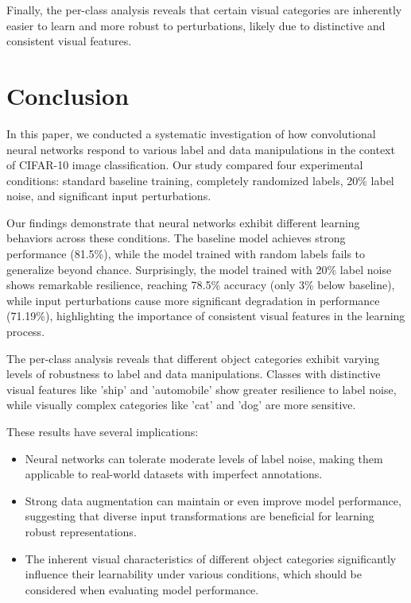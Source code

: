 \documentclass[10pt,twocolumn,letterpaper]{article}
\begin{document}
Finally, the per-class analysis reveals that certain visual categories are inherently easier to learn and more robust to perturbations, likely due to distinctive and consistent visual features.

\section{Conclusion}
\label{sec:conclusion}

In this paper, we conducted a systematic investigation of how convolutional neural networks respond to various label and data manipulations in the context of CIFAR-10 image classification.
Our study compared four experimental conditions: standard baseline training, completely randomized labels, 20\% label noise, and significant input perturbations.

Our findings demonstrate that neural networks exhibit different learning behaviors across these conditions.
The baseline model achieves strong performance (81.5\%), while the model trained with random labels fails to generalize beyond chance.
Surprisingly, the model trained with 20\% label noise shows remarkable resilience, reaching 78.5\% accuracy (only 3\% below baseline), while input perturbations cause more significant degradation in performance (71.19\%), highlighting the importance of consistent visual features in the learning process.

The per-class analysis reveals that different object categories exhibit varying levels of robustness to label and data manipulations.
Classes with distinctive visual features like 'ship' and 'automobile' show greater resilience to label noise, while visually complex categories like 'cat' and 'dog' are more sensitive.

These results have several implications:

\begin{itemize}
    \item Neural networks can tolerate moderate levels of label noise, making them applicable to real-world datasets with imperfect annotations.
    \item Strong data augmentation can maintain or even improve model performance, suggesting that diverse input transformations are beneficial for learning robust representations.
    \item The inherent visual characteristics of different object categories significantly influence their learnability under various conditions, which should be considered when evaluating model performance.
\end{itemize}
\end{document}

